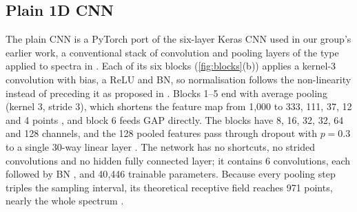 \documentclass[journal,onecolumn]{IEEEtran}
\begin{document}
\subsection{Plain 1D CNN}
\label{sec:models-cnn}
The plain CNN is a PyTorch \cite{paszke2019pytorch} port of the six-layer
Keras CNN used in our group's earlier work, a conventional stack of
convolution and pooling layers \cite{lecun1998gradient} of the type applied
to spectra in \cite{acquarelli2017convolutional,liu2017deep}. Each of its
six blocks (\cref{fig:blocks}(b)) applies a kernel-3 convolution with
bias, a ReLU \cite{nair2010rectified} and BN, so normalisation follows the
non-linearity instead of preceding it as proposed in \cite{ioffe2015batch}.
Blocks 1--5 end with average pooling (kernel 3, stride 3), which shortens
the feature map from 1{,}000 to 333, 111, 37, 12 and 4 points
\cite{lecun1998gradient}, and block 6 feeds GAP \cite{lin2014network}
directly. The blocks have 8, 16, 32, 32, 64 and 128 channels, and the
128 pooled features pass through dropout with $p=0.3$
\cite{srivastava2014dropout} to a single 30-way linear layer
\cite{lin2014network}. The network has no shortcuts, no strided
convolutions and no hidden fully connected layer; it contains 6
convolutions, each followed by BN \cite{ioffe2015batch}, and 40{,}446
trainable parameters.
Because every pooling step triples the sampling interval, its theoretical
receptive field reaches 971 points, nearly the whole spectrum
\cite{luo2016understanding}.
\end{document}

